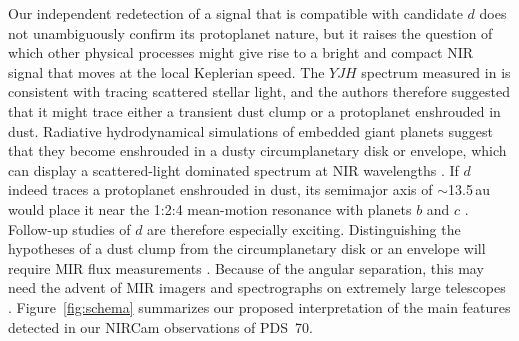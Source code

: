\documentclass[longauth]{aa}
\newcommand{\vc}[1]{#1}
\newcommand{\new}[1]{#1}
\begin{document}
\new{Our independent redetection of a signal that is compatible with candidate $d$ does not unambiguously confirm its protoplanet nature, but}
it raises the question of which other physical processes might give rise to a bright and compact NIR signal that moves at \vc{the} local Keplerian speed. %
The $YJH$ spectrum measured in  is consistent with tracing scattered stellar light, and the authors therefore suggested that it might trace either a transient dust clump %
or a protoplanet enshrouded in dust. 
Radiative hydrodynamical simulations of embedded giant planets suggest that they become enshrouded in a dusty circumplanetary disk or envelope, which can display a scattered-light dominated spectrum at NIR wavelengths \citep[e.g.,][]{Szulagyi2019}.
If $d$ indeed traces a protoplanet enshrouded in dust, its semimajor axis of $\sim$13.5\,au would place it near the 1:2:4 mean-motion resonance with planets $b$ and $c$ %
\citep[$a_b\approx 21$\,au and $a_c \approx 34$\,au;][]{Wang2021}. Follow-up studies of $d$
are therefore especially exciting. %
Distinguishing the hypotheses of a %
dust clump from the circumplanetary disk or an envelope will require MIR flux measurements \citep[e.g.,][]{Chen2022}. Because of the angular separation, this may need the advent of MIR imagers and spectrographs on extremely large telescopes \citep[e.g., ELT/METIS;][]{Brandl2018}. Figure~\ref{fig:schema} summarizes our proposed interpretation of the main features detected in our NIRCam observations of PDS~70.
 
\end{document}
